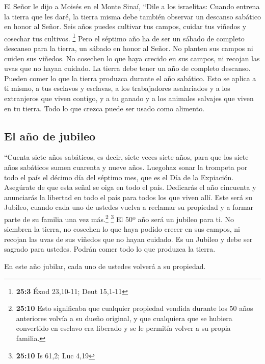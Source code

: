  El Señor le dijo a Moisés en el Monte Sinaí,
 ``Dile a los israelitas: Cuando entrena la tierra que les
daré, la tierra misma debe también observar un descanso sabático en
honor al Señor.  Seis años puedes cultivar tus campos,
cuidar tus viñedos y cosechar tus cultivos. \footnote{\textbf{25:3} Éxod
  23,10-11; Deut 15,1-11}  Pero el séptimo año ha de ser
un sábado de completo descanso para la tierra, un sábado en honor al
Señor. No planten sus campos ni cuiden sus viñedos.  No
cosechen lo que haya crecido en sus campos, ni recojan las uvas que no
hayan cuidado. La tierra debe tener un año de completo descanso.
 Pueden comer lo que la tierra produzca durante el año
sabático. Esto se aplica a ti mismo, a tus esclavos y esclavas, a los
trabajadores asalariados y a los extranjeros que viven contigo,
 y a tu ganado y a los animales salvajes que viven en tu
tierra. Todo lo que crezca puede ser usado como alimento.

\hypertarget{el-auxf1o-de-jubileo}{%
\subsection{El año de jubileo}\label{el-auxf1o-de-jubileo}}

 ``Cuenta siete años sabáticos, es decir, siete veces
siete años, para que los siete años sabáticos sumen cuarenta y nueve
años.  Luegohaz sonar la trompeta por todo el país el
décimo día del séptimo mes, que es el Día de la Expiación. Asegúrate de
que esta señal se oiga en todo el país.  Dedicarás el año
cincuenta y anunciarás la libertad en todo el país para todos los que
viven allí. Este será su Jubileo, cuando cada uno de ustedes vuelva a
reclamar su propiedad y a formar parte de su familia una vez
más.\footnote{\textbf{25:10} Esto significaba que cualquier propiedad
  vendida durante los 50 años anteriores volvía a su dueño original, y
  que cualquiera que se hubiera convertido en esclavo era liberado y se
  le permitía volver a su propia familia.} \footnote{\textbf{25:10} Is
  61,2; Luc 4,19}  El 50º año será un jubileo para ti. No
siembren la tierra, no cosechen lo que haya podido crecer en sus campos,
ni recojan las uvas de sus viñedos que no hayan cuidado. 
Es un Jubileo y debe ser sagrado para ustedes. Podrán comer todo lo que
produzca la tierra.

 En este año jubilar, cada uno de ustedes volverá a su
propiedad.

